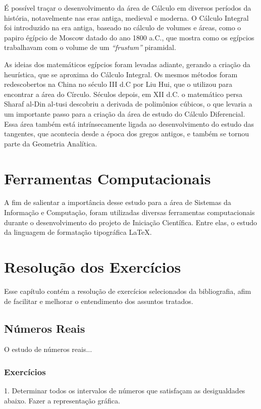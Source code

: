 \documentclass[12 pt, openright, twoside, a4paper, english, french, spanish, brazil]{abntex2}
\begin{document}
É possível traçar o desenvolvimento da área de Cálculo em diversos períodos da história, notavelmente nas eras antiga, medieval e moderna. O Cálculo Integral foi introduzido na era antiga, baseado no cálculo de volumes e áreas, como o papiro égípcio de Moscow datado do ano 1800 a.C., que mostra como os egípcios trabalhavam com o volume de um \textit{``frustum''} piramidal.

As ideias dos matemáticos egípcios foram levadas adiante, gerando a criação da heurística, que se aproxima do Cálculo Integral. Os mesmos métodos foram redescobertos na China no século III d.C por Liu Hui, que o utilizou para encontrar a área do Círculo. 
Séculos depois, em XII d.C. o matemático persa Sharaf al-Din al-tusi descobriu a derivada de polimônios cúbicos, o que levaria a um importante passo para a criação da área de estudo do Cálculo Diferencial. Essa área também está intrínsecamente ligada ao desenvolvimento do estudo das tangentes, que acontecia desde a época dos gregos antigos, e também se tornou parte da Geometria Analítica. 

\chapter{Ferramentas Computacionais}

A fim de salientar a importância desse estudo para a área de Sistemas da Informação e Computação, foram utilizadas diversas ferramentas computacionais durante o desenvolvimento do projeto de Iniciação Científica. Entre elas, o estudo da linguagem de formatação tipográfica \LaTeX.

\chapter{Resolução dos Exercícios}

Esse capítulo contém a resolução de exercícios selecionados da bibliografia, afim de facilitar e melhorar o entendimento dos assuntos tratados.

\section{Números Reais}

O estudo de números reais...

\subsection{Exercícios}
1. Determinar todos os intervalos de números que satisfaçam as desigualdades abaixo. Fazer a representação gráfica.
\end{document}

